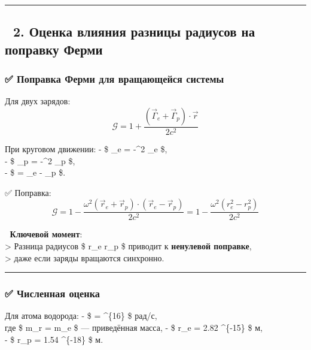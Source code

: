 \documentclass[11pt]{article}
\begin{document}
\begin{center}\rule{0.5\linewidth}{\linethickness}\end{center}

\subsection{🔹 2. Оценка влияния разницы радиусов на поправку
Ферми}\label{ux43eux446ux435ux43dux43aux430-ux432ux43bux438ux44fux43dux438ux44f-ux440ux430ux437ux43dux438ux446ux44b-ux440ux430ux434ux438ux443ux441ux43eux432-ux43dux430-ux43fux43eux43fux440ux430ux432ux43aux443-ux444ux435ux440ux43cux438}

\subsubsection{✅ Поправка Ферми для вращающейся
системы}\label{ux43fux43eux43fux440ux430ux432ux43aux430-ux444ux435ux440ux43cux438-ux434ux43bux44f-ux432ux440ux430ux449ux430ux44eux449ux435ux439ux441ux44f-ux441ux438ux441ux442ux435ux43cux44b}

Для двух зарядов: \[
\mathcal{G} = 1 + \frac{(\vec{\Gamma}_e + \vec{\Gamma}_p) \cdot \vec{r}}{2c^2}
\]

При круговом движении: - \$ \vec{\Gamma}\_e = -\omega\^{}2 \_e
\$,\\
- \$ \vec{\Gamma}\_p = -\omega\^{}2 \_p \$,\\
- \$  = \_e - \_p \$.

✅ Поправка: \[
\mathcal{G} = 1 - \frac{\omega^2 (\vec{r}_e + \vec{r}_p) \cdot (\vec{r}_e - \vec{r}_p)}{2c^2} = 1 - \frac{\omega^2 (r_e^2 - r_p^2)}{2c^2}
\]

📌 \textbf{Ключевой момент}:\\
\textgreater{} Разница радиусов \$ r\_e \ne r\_p \$ приводит к
\textbf{ненулевой поправке},\\
\textgreater{} даже если заряды вращаются синхронно.

\begin{center}\rule{0.5\linewidth}{\linethickness}\end{center}

\subsubsection{✅ Численная
оценка}\label{ux447ux438ux441ux43bux435ux43dux43dux430ux44f-ux43eux446ux435ux43dux43aux430}

Для атома водорода: - \$ \omega =
 
\^{}\{16\} \$ рад/с,\\
где \$ m\_r =  \approx m\_e \$ --- приведённая
масса, - \$ r\_e = 2.82 \^{}\{-15\} \$ м,\\
- \$ r\_p = 1.54 \^{}\{-18\} \$ м.
\end{document}
